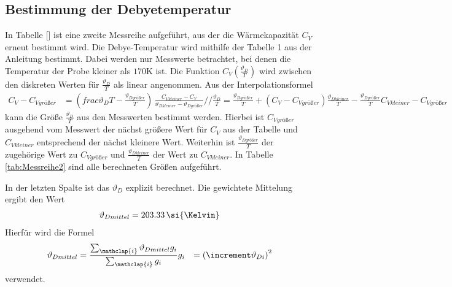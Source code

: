 \subsection{Bestimmung der Debyetemperatur}
In Tabelle [] ist eine zweite Messreihe aufgeführt, aus der die Wärmekapazität $C_V$ erneut bestimmt wird.
Die Debye-Temperatur wird mithilfe der Tabelle 1 aus der Anleitung bestimmt.
Dabei werden nur Messwerte betrachtet, bei denen die Temperatur der Probe kleiner als $170 \si{\kelvin}$ ist.
Die Funktion $C_V(\frac{\vartheta_D}{T})$ wird zwischen den diskreten Werten für $\frac{\vartheta_D}{T}$ als linear angenommen.
Aus der Interpolationsformel
\begin{align}
C_V - C_{V größer} &= \left( frac{\vartheta_D}{T} - \frac{\vartheta_{D größer}}{T} \right) \, \frac{C_{V kleiner} - C_V}{\vartheta_{D kleiner}- \vartheta_{D größer}} //
\frac{\vartheta_D}{T} = \frac{\vartheta_{D größer}}{T} + \left( C_V - C_{V größer} \right) \frac{\vartheta_{D kleiner}}{T} - \frac{\vartheta_{D größer}}{T}{C_{V kleiner}- C_{V größer}}
\end{align}
kann die Größe $\frac{\vartheta_D}{T}$ aus den Messwerten bestimmt werden.
Hierbei ist $C_{V größer}$ ausgehend vom Messwert der nächst größere Wert für $C_V$ aus der Tabelle und $C_{V kleiner}$ entsprechend der
nächst kleinere Wert.
Weiterhin ist $\frac{\vartheta_{D größer}}{T}$ der zugehörige Wert zu $C_{V größer}$ und $\frac{\vartheta_{D kleiner}}{T}$ der Wert zu $C_{V kleiner}$.
In Tabelle \ref{tab:Messreihe2} sind alle berechneten Größen aufgeführt.

In der letzten Spalte ist das $\vartheta_D$ explizit berechnet.
Die gewichtete Mittelung ergibt den Wert
\begin{align}
  \vartheta_{D mittel} = 203.33 \, \si{\Kelvin}
\end{align}
Hierfür wird die Formel
\begin{align}
    \vartheta_{D mittel} &= \frac{\sum_{\mathclap{i}}  \vartheta_{D mittel} g_i}{\sum_{\mathclap{i}} g_i}
g_i &= \left( \increment \vartheta_{D i} \right) ^2
\end{align}
verwendet.
